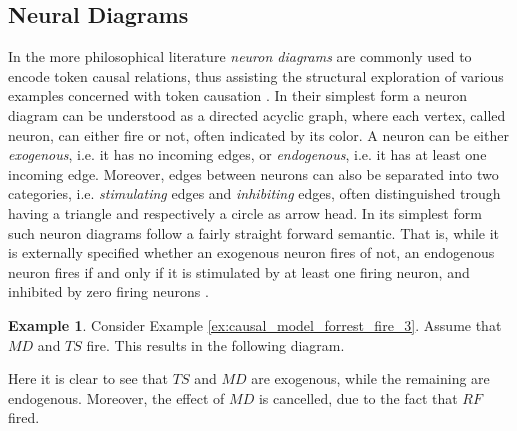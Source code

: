 \documentclass[11pt,a4paper]{book}
\theoremstyle{definition}
\theoremstyle{definition}
\newtheorem{example}{Example}[section]
\theoremstyle{definition}
\theoremstyle{remark}
\begin{document}
\subsection{Neural Diagrams}
\label{sec:neural_diagrams}
In the more philosophical literature \emph{neuron diagrams} are commonly used to encode token causal relations, thus assisting the structural exploration of various examples concerned with token causation \cite{baumgartner2013regularity,erwig2010causal}. 
In their simplest form a neuron diagram can be understood as a directed acyclic graph, where each vertex, called neuron, can either fire or not, often indicated by its color. A neuron can be either \emph{exogenous}, i.e. it has no incoming edges, or \emph{endogenous}, i.e. it has at least one incoming edge. Moreover, edges between neurons can also be separated into two categories, i.e. \emph{stimulating} edges and \emph{inhibiting} edges, often distinguished trough having a triangle and respectively a circle as arrow head. 
In its simplest form such neuron diagrams follow a fairly straight forward semantic. That is, while it is externally specified whether an exogenous neuron fires of not, an endogenous neuron fires if and only if it is stimulated by at least one firing neuron, and inhibited by zero firing neurons \cite{hitchcock2009structural,erwig2010causal,baumgartner2013regularity}. 

\begin{example}
Consider Example \ref{ex:causal_model_forrest_fire_3}. Assume that $\mathit{MD}$ and $\mathit{TS}$ fire. This results in the following diagram.
\begin{center}
\end{center}
Here it is clear to see that $\mathit{TS}$ and $\mathit{MD}$ are exogenous, while the remaining are endogenous. Moreover, the effect of $\mathit{MD}$ is cancelled, due to the fact that $\mathit{RF}$ fired.
\end{example}
\end{document}
